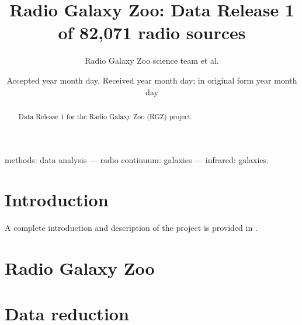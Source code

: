\documentclass[a4,useAMS,usenatbib]{mn2e}
\title[Radio Galaxy Zoo]{Radio Galaxy Zoo: Data Release 1 of 82,071 radio sources}
\author[RGZ team]{Radio Galaxy Zoo science team et al.
}
\begin{document}
\date{Accepted year month day. Received year month day; in original form year month day}

\pagerange{\pageref{firstpage}--\pageref{lastpage}} 

\maketitle

\label{firstpage}

\begin{abstract}
Data Release 1 for the Radio Galaxy Zoo (RGZ) project.
\end{abstract}
\begin{keywords}
methods: data analysis --- radio continuum: galaxies --- infrared: galaxies. 
\end{keywords}

\section{Introduction}\label{sec:intro}

A complete introduction and description of the project is provided in \citet[][hereafter B15]{ban15}. 

\section{Radio Galaxy Zoo}\label{sec:sample}

\section{Data reduction}\label{sec:data_reduction}
\end{document}
